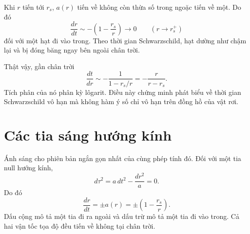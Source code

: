 Khi \(r\) tiến tới \(r_s\), \(a(r)\) tiến về không còn thừa số trong ngoặc tiến về một. Do đó
\begin{equation}
\frac{dr}{dt}
\sim -\left(1-\frac{r_s}{r}\right)
\longrightarrow 0
\qquad(r\longrightarrow r_s^+)
\label{eq:l5-infall-freeze}
\end{equation}
đối với một hạt đi vào trong. Theo thời gian Schwarzschild, hạt dường như chậm lại và bị đóng băng ngay bên ngoài chân trời.

\begin{classroomqa}
\end{classroomqa}

Thật vậy, gần chân trời
\begin{equation}
\frac{dt}{dr}
\sim-\frac{1}{1-r_s/r}
=-\frac{r}{r-r_s}.
\end{equation}
Tích phân của nó phân kỳ lôgarit. Điều này chứng minh phát biểu về thời gian Schwarzschild vô hạn mà không hàm ý số chỉ vô hạn trên đồng hồ của vật rơi.

\section{Các tia sáng hướng kính}

Ánh sáng cho phiên bản ngắn gọn nhất của cùng phép tính đó. Đối với một tia null hướng kính,
\begin{equation}
d\tau^2
=a\,dt^2-\frac{dr^2}{a}=0.
\end{equation}
Do đó
\begin{equation}
\boxed{
\frac{dr}{dt}
=\pm a(r)
=\pm\left(1-\frac{r_s}{r}\right).
}
\label{eq:l5-radial-light}
\end{equation}
Dấu cộng mô tả một tia đi ra ngoài và dấu trừ mô tả một tia đi vào trong. Cả hai vận tốc tọa độ đều tiến về không tại chân trời.

\begin{classroomqa}
\end{classroomqa}


